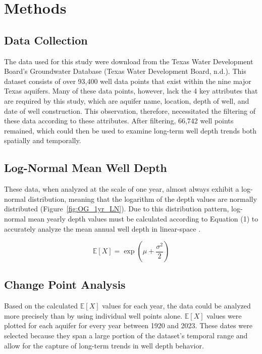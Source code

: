 \section*{Methods}

\subsection*{Data Collection}

The data used for this study were download from the Texas Water Development Board’s Groundwater Database (Texas Water Development Board, n.d.). This dataset consists of over 93,400 well data points that exist within the nine major Texas aquifers. Many of these data points, however, lack the 4 key attributes that are required by this study, which are aquifer name, location, depth of well, and date of well construction. This observation, therefore, necessitated the filtering of these data according to these attributes. After filtering, 66,742 well points remained, which  could then be used to examine long-term well depth trends both spatially and temporally.

\subsection*{Log-Normal Mean Well Depth}

These data, when analyzed at the scale of one year, almost always exhibit a log-normal distribution, meaning that the logarithm of the depth values are normally distributed (Figure~\ref{fig:OG_1yr_LN}). Due to this distribution pattern, log-normal mean yearly depth values must be calculated according to Equation (1) to accurately analyze the mean annual well depth in linear-space \cite{Jarvis2016}.

\begin{equation}
    \mathbb{E}[X] = \exp\left(\mu + \frac{\sigma^2}{2}\right)
\end{equation}

\subsection*{Change Point Analysis}

Based on the calculated $\mathbb{E}[X]$ values for each year, the data could be analyzed more precisely than by using individual well points alone. $\mathbb{E}[X]$ values were plotted for each aquifer for every year between 1920 and 2023. These dates were selected because they span a large portion of the dataset’s temporal range and allow for the capture of long-term trends in well depth behavior.

